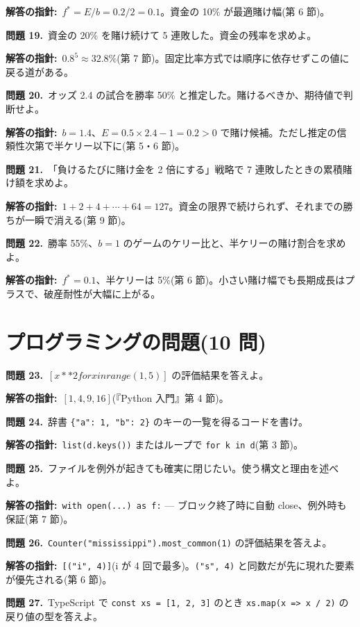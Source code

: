 \documentclass{article}
\begin{document}
\textbf{解答の指針:}\ \(f^* = E / b = 0.2 / 2 = 0.1\)。資金の 10\% が最適賭け幅(第 6 節)。

\textbf{問題 19.}\ 資金の 20\% を賭け続けて 5 連敗した。資金の残率を求めよ。

\textbf{解答の指針:}\ \(0.8^5 \approx 32.8\%\)(第 7 節)。固定比率方式では順序に依存せずこの値に戻る道がある。

\textbf{問題 20.}\ オッズ 2.4 の試合を勝率 50\% と推定した。賭けるべきか、期待値で判断せよ。

\textbf{解答の指針:}\ \(b = 1.4\)、\(E = 0.5 \times 2.4 - 1 = 0.2 > 0\) で賭け候補。ただし推定の信頼性次第で半ケリー以下に(第 5・6 節)。

\textbf{問題 21.}\ 「負けるたびに賭け金を 2 倍にする」戦略で 7 連敗したときの累積賭け額を求めよ。

\textbf{解答の指針:}\ \(1 + 2 + 4 + \cdots + 64 = 127\)。資金の限界で続けられず、それまでの勝ちが一瞬で消える(第 9 節)。

\textbf{問題 22.}\ 勝率 55\%、\(b = 1\) のゲームのケリー比と、半ケリーの賭け割合を求めよ。

\textbf{解答の指針:}\ \(f^* = 0.1\)、半ケリーは 5\%(第 6 節)。小さい賭け幅でも長期成長はプラスで、破産耐性が大幅に上がる。

\section{プログラミングの問題(10 問)}

\textbf{問題 23.}\ \([x ** 2 for x in range(1, 5)]\) の評価結果を答えよ。

\textbf{解答の指針:}\ \([1, 4, 9, 16]\)(『Python 入門』第 4 節)。

\textbf{問題 24.}\ 辞書 \texttt{\{"a": 1, "b": 2\}} のキーの一覧を得るコードを書け。

\textbf{解答の指針:}\ \texttt{list(d.keys())} またはループで \texttt{for k in d}(第 3 節)。

\textbf{問題 25.}\ ファイルを例外が起きても確実に閉じたい。使う構文と理由を述べよ。

\textbf{解答の指針:}\ \texttt{with open(...) as f:} — ブロック終了時に自動 close、例外時も保証(第 7 節)。

\textbf{問題 26.}\ \texttt{Counter("mississippi").most\_common(1)} の評価結果を答えよ。

\textbf{解答の指針:}\ \texttt{[("i", 4)]}(i が 4 回で最多)。\texttt{("s", 4)} と同数だが先に現れた要素が優先される(第 6 節)。

\textbf{問題 27.}\ TypeScript で \texttt{const xs = [1, 2, 3]} のとき \texttt{xs.map(x => x / 2)} の戻り値の型を答えよ。
\end{document}
